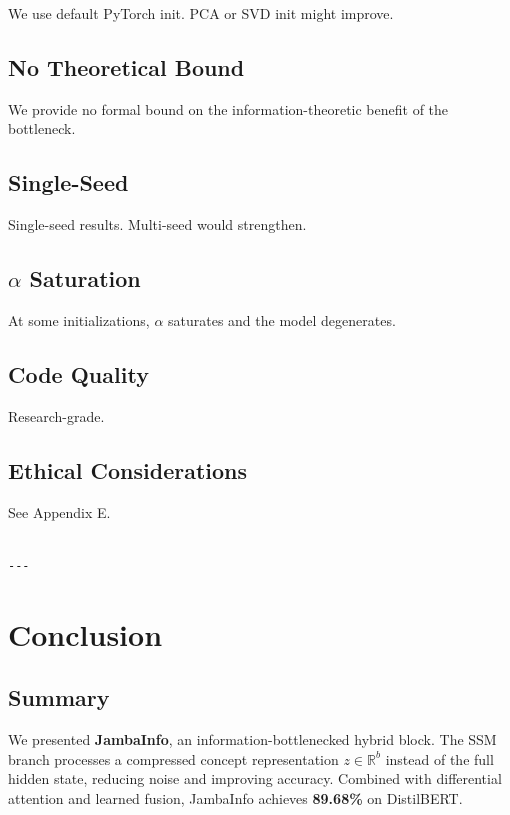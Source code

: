 We use default PyTorch init. PCA or SVD init might improve.

\subsection{No Theoretical Bound}

We provide no formal bound on the information-theoretic benefit of the 
bottleneck.

\subsection{Single-Seed}

Single-seed results. Multi-seed would strengthen.

\subsection{$\alpha$ Saturation}

At some initializations, $\alpha$ saturates and the model degenerates.

\subsection{Code Quality}

Research-grade.

\subsection{Ethical Considerations}

See Appendix E.
\begin{lstlisting}

---
\end{lstlisting}

\section{Conclusion}

\subsection{Summary}

We presented \textbf{JambaInfo}, an information-bottlenecked hybrid block. The 
SSM branch processes a compressed concept representation $z \in \mathbb{R}^b$ 
instead of the full hidden state, reducing noise and improving accuracy. 
Combined with differential attention and learned fusion, JambaInfo achieves 
\textbf{89.68\%} on DistilBERT.

